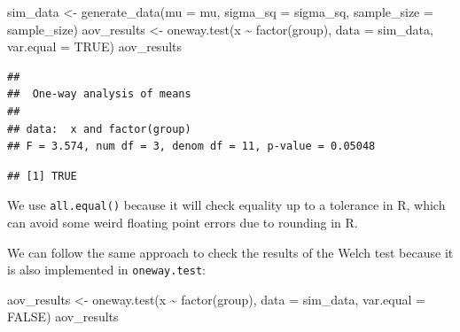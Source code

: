 \documentclass[
]{book}
\newenvironment{Shaded}{\begin{snugshade}}{\end{snugshade}}
\newcommand{\AttributeTok}[1]{\textcolor[rgb]{0.77,0.63,0.00}{#1}}
\newcommand{\ConstantTok}[1]{\textcolor[rgb]{0.00,0.00,0.00}{#1}}
\newcommand{\FunctionTok}[1]{\textcolor[rgb]{0.00,0.00,0.00}{#1}}
\newcommand{\NormalTok}[1]{#1}
\newcommand{\OtherTok}[1]{\textcolor[rgb]{0.56,0.35,0.01}{#1}}
\newcommand{\SpecialCharTok}[1]{\textcolor[rgb]{0.00,0.00,0.00}{#1}}
\begin{document}
\begin{Shaded}
\begin{Highlighting}[]
\NormalTok{sim\_data }\OtherTok{\textless{}{-}} \FunctionTok{generate\_data}\NormalTok{(}\AttributeTok{mu =}\NormalTok{ mu, }\AttributeTok{sigma\_sq =}\NormalTok{ sigma\_sq,}
                          \AttributeTok{sample\_size =}\NormalTok{ sample\_size)}
\NormalTok{aov\_results }\OtherTok{\textless{}{-}} \FunctionTok{oneway.test}\NormalTok{(x }\SpecialCharTok{\textasciitilde{}} \FunctionTok{factor}\NormalTok{(group), }\AttributeTok{data =}\NormalTok{ sim\_data, }
                           \AttributeTok{var.equal =} \ConstantTok{TRUE}\NormalTok{)}
\NormalTok{aov\_results}
\end{Highlighting}
\end{Shaded}

\begin{verbatim}
## 
##  One-way analysis of means
## 
## data:  x and factor(group)
## F = 3.574, num df = 3, denom df = 11, p-value = 0.05048
\end{verbatim}

\begin{Shaded}
\end{Shaded}

\begin{verbatim}
## [1] TRUE
\end{verbatim}

We use \texttt{all.equal()} because it will check equality up to a tolerance in R, which can avoid some weird floating point errors due to rounding in R.

We can follow the same approach to check the results of the Welch test because it is also implemented in \texttt{oneway.test}:

\begin{Shaded}
\begin{Highlighting}[]
\NormalTok{aov\_results }\OtherTok{\textless{}{-}} \FunctionTok{oneway.test}\NormalTok{(x }\SpecialCharTok{\textasciitilde{}} \FunctionTok{factor}\NormalTok{(group),}
                           \AttributeTok{data =}\NormalTok{ sim\_data, }
                           \AttributeTok{var.equal =} \ConstantTok{FALSE}\NormalTok{)}
\NormalTok{aov\_results}
\end{Highlighting}
\end{Shaded}
\end{document}
